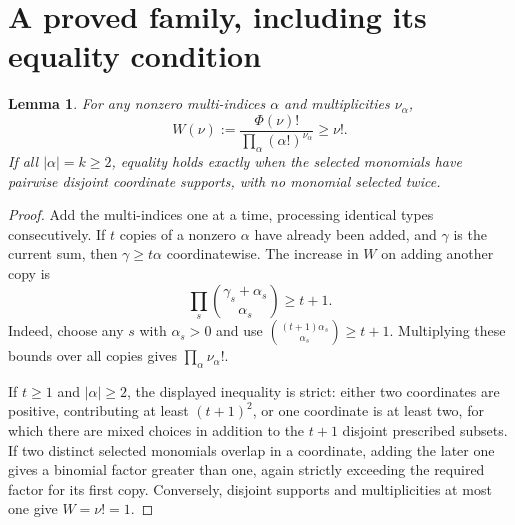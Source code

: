 \documentclass[11pt]{article}
\newtheorem{lemma}[theorem]{Lemma}
\begin{document}
\section{A proved family, including its equality condition}
\begin{lemma}\label{factorial}
For any nonzero multi-indices $\alpha$ and multiplicities $\nu_\alpha$,
\[
 W(\nu):=\frac{\Phi(\nu)!}{\prod_\alpha(\alpha!)^{\nu_\alpha}}\geq\nu!.
\]
If all $|\alpha|=k\geq2$, equality holds exactly when the selected monomials
have pairwise disjoint coordinate supports, with no monomial selected twice.
\end{lemma}
\begin{proof}
Add the multi-indices one at a time, processing identical types consecutively.
If $t$ copies of a nonzero $\alpha$ have already been added, and $\gamma$ is
the current sum, then $\gamma\geq t\alpha$ coordinatewise. The increase in
$W$ on adding another copy is
\[
 \prod_s\binom{\gamma_s+\alpha_s}{\alpha_s}\geq t+1.
\]
Indeed, choose any $s$ with $\alpha_s>0$ and use
$\binom{(t+1)\alpha_s}{\alpha_s}\geq t+1$. Multiplying these bounds over
all copies gives $\prod_\alpha\nu_\alpha!$.

If $t\geq1$ and $|\alpha|\geq2$, the displayed inequality is strict:
either two coordinates are positive, contributing at least $(t+1)^2$, or
one coordinate is at least two, for which there are mixed choices in addition
to the $t+1$ disjoint prescribed subsets. If two distinct selected monomials
overlap in a coordinate, adding the later one gives a binomial factor greater
than one, again strictly exceeding the required factor for its first copy.
Conversely, disjoint supports and multiplicities at most one give $W=\nu!=1$.
\end{proof}
\end{document}

